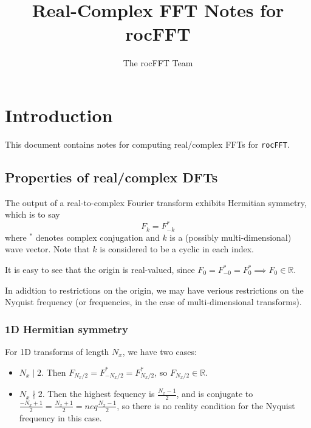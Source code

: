 \documentclass[12pt]{article}
\title{Real-Complex FFT Notes for rocFFT}
\author{The rocFFT Team}
\renewcommand{\(}{\left(}
\renewcommand{\)}{\right)}
\begin{document}
\maketitle

\section{Introduction}

This document contains notes for computing real/complex FFTs
for \texttt{rocFFT}.


\subsection{Properties of real/complex DFTs}

The output of a real-to-complex Fourier transform exhibits Hermitian
symmetry, which is to say
\begin{dmath}
  F_k = F^*_{-k}
\end{dmath}
where ${}^*$ denotes complex conjugation and $k$ is a (possibly
multi-dimensional) wave vector.  Note that $k$ is considered to be a
cyclic in each index.

It is easy to see that the origin is real-valued, since
$F_0=F^*_{-0}=F^*_{0}\implies F_0\in\mathbb{R}$.

In adidtion to restrictions on the origin, we may have verious
restrictions on the Nyquist frequency (or frequencies, in the case of
multi-dimensional transforms).

\subsubsection{1D Hermitian symmetry}
For 1D transforms of length $N_x$, we have two cases:
\begin{itemize}
\item $N_x\mid 2$.  Then $F_{N_x/2} = F^*_{-N_x/2} = F^*_{N_x/2}$, so
  $F_{N_x/2}\in\mathbb{R}$.
\item $N_x\nmid 2$.  Then the highest fequency is $\frac{N_x - 1}{2}$,
  and is conjugate to
  $\frac{-N_x+1}{2}=\frac{N_x+1}{2}=neq\frac{N_x-1}{2}$, so there is no reality
  condition for the Nyquist frequency in this case.
\end{itemize}
\end{document}
